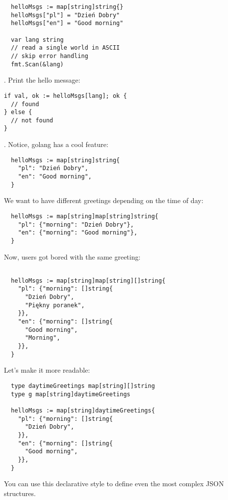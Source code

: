 \documentclass[11pt, letterpaper]{article}
\begin{document}
\begin{verbatim}
  helloMsgs := map[string]string{}
  helloMsgs["pl"] = "Dzień Dobry"
  helloMsgs["en"] = "Good morning"

  var lang string
  // read a single world in ASCII
  // skip error handling
  fmt.Scan(&lang)
\end{verbatim}

. Print the hello message:

\begin{verbatim}
if val, ok := helloMsgs[lang]; ok {
  // found
} else {
  // not found
}
\end{verbatim}

. Notice, golang has a cool feature:

\begin{verbatim}
  helloMsgs := map[string]string{
    "pl": "Dzień Dobry",
    "en": "Good morning",
  }
\end{verbatim}

We want to have different greetings depending on the time of day:

\begin{verbatim}
  helloMsgs := map[string]map[string]string{
    "pl": {"morning": "Dzień Dobry"},
    "en": {"morning": "Good morning"},
  }
\end{verbatim}

Now, users got bored with the same greeting:

\begin{verbatim}

  helloMsgs := map[string]map[string][]string{
    "pl": {"morning": []string{
      "Dzień Dobry",
      "Piękny poranek",
    }},
    "en": {"morning": []string{
      "Good morning",
      "Morning",
    }},
  }
\end{verbatim}

Let's make it more readable:

\begin{verbatim}
  type daytimeGreetings map[string][]string
  type g map[string]daytimeGreetings

  helloMsgs := map[string]daytimeGreetings{
    "pl": {"morning": []string{
      "Dzień Dobry",
    }},
    "en": {"morning": []string{
      "Good morning",
    }},
  }
\end{verbatim}

You can use this declarative style to define even the most complex JSON structures.
\end{document}
